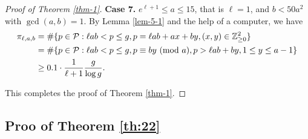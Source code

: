 \documentclass[12pt,a4paper,reqno]{amsart}
\numberwithin{equation}{section}
\def\Z{{\mathbb Z}}
\def\pmod #1{\ ({\rm{mod}}\ #1)}
\def\cP{{\mathcal P}}
\theoremstyle{plain}
\theoremstyle{definition}
\begin{document}
\begin{proof}[Proof of Theorem \ref{thm-1}]
	\textbf{Case 7.} $e^{\ell+1}\leq a\leq 15$, that is $\ell=1$, and $b< 50a^{2}$ with $\gcd(a,b)=1$.
	By Lemma \ref{lem-5-1} and the help of a computer, we have 
	\begin{align*}
		\pi_{\ell,a,b}
		&= \#\{p\in\cP :\ell ab< p\leq g,p=\ell ab+ax+by,(x,y)\in \Z_{\geq 0}^{2}\}\\
		&= \#\{p\in \mathcal{P}: \ell ab< p\leq g,p\equiv by \pmod{a}, p>\ell ab+by, 1\leq y\leq a-1\}\\
		&\geq 0.1 \cdot \frac{1}{\ell+1}\frac{g}{\log g}.
	\end{align*}
	
	This completes the proof of Theorem \ref{thm-1}.
\end{proof}


\subsection{Proo of Theorem \ref{th:22}}  
\end{document}
